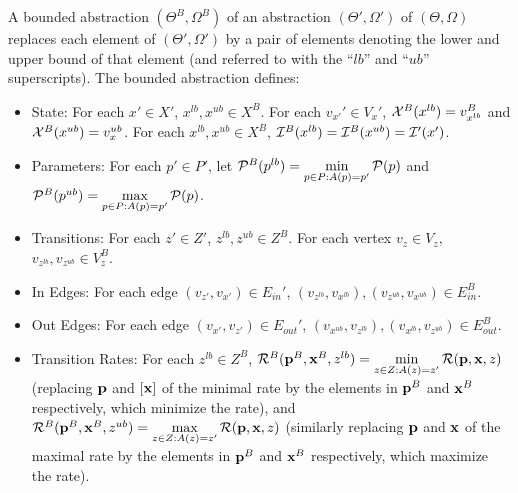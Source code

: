 \begin{definition}
A bounded abstraction $(\Theta^B, \Omega^B)$ of an abstraction $(\Theta',
\Omega')$ of $(\Theta, \Omega)$ replaces each element of $(\Theta',
\Omega')$ by a pair of elements denoting the lower and upper bound of that
element (and referred to with the ``$lb$'' and ``$ub$'' superscripts).  The
bounded abstraction defines:
\begin{itemize}
    \item State: For each $x' \in X'$,  $x^{lb}, x^{ub} \in X^B$.  For each
    $v_{x'}' \in V_x'$, ${\cal X}^B(x^{lb}) = v_{x^{lb}}^B$ and ${\cal X}^B(x^{ub}) =
    v_x^{ub}$.   For each $x^{lb}, x^{ub} \in X^B$, ${\cal I}^B(x^{lb}) = {\cal
    I}^B(x^{ub}) = {\cal I}'(x')$.
        \item Parameters: For each $p' \in P'$,
        let ${\cal P}^B(p^{lb}) = \min\limits_{p \in P: A(p) = p'} {\cal P}(p)$ and ${\cal P}^B(p^{ub}) = \max\limits_{p \in P: A(p) = p'} {\cal P}(p)$. 
        

        \item Transitions: For each $z' \in Z'$, $z^{lb}, z^{ub} \in Z^B$.
        For each vertex $v_z \in V_z$, $v_{z^{lb}}, v_{z^{ub}} \in V_z^B$.
        
        \item In Edges: For each edge $(v_{z'}, v_{x'}) \in E_{in}'$, $(v_{z^{lb}},
        v_{x^{lb}}), (v_{z^{ub}},
        v_{x^{ub}}) \in E^B_{in}$.
        \item Out Edges: For each edge $(v_{x'}, v_{z'}) \in E_{out}'$, $(v_{x^{ub}},
        v_{z^{lb}}), (v_{x^{lb}},
        v_{z^{ub}}) \in E^B_{out}$.

        
        \item Transition Rates: For each $z^{lb} \in Z^B$, ${\cal R}^B({\bf p}^B, {\bf
        x}^B, z^{lb}) = \min\limits_{z \in Z: A(z)=z'} {\cal R}({\bf p}, {\bf
        x}, z)$ (replacing ${\bf p}$ and $[\bf x]$ of the minimal rate by the 
        elements in ${\bf p}^B$ and ${\bf x}^B$ respectively, which minimize the
        rate), and ${\cal R}^B({\bf p}^B,
        {\bf
        x}^B, z^{ub}) = \max\limits_{z \in Z: A(z)=z'} {\cal R}({\bf p}, {\bf
        x}, z)$ (similarly replacing ${\bf p}$ and ${\bf x}$ of the maximal rate by the 
        elements in ${\bf p}^B$ and ${\bf x}^B$ respectively, which maximize the
        rate).
\end{itemize}
    
\end{definition}

